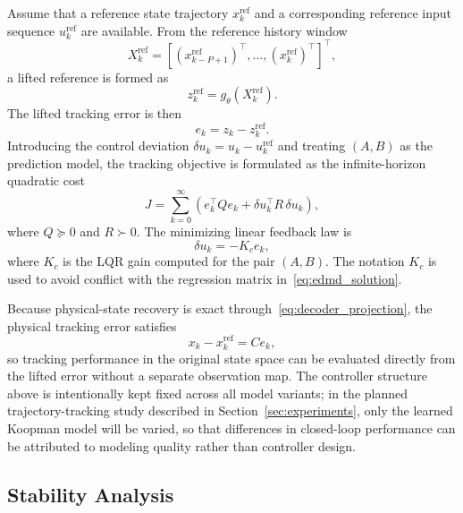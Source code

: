 \documentclass[journal]{IEEEtran}
\begin{document}
Assume that a reference state trajectory $x_k^{\mathrm{ref}}$ and a corresponding reference input sequence $u_k^{\mathrm{ref}}$ are available. From the reference history window
\begin{equation}
    X_k^{\mathrm{ref}} = [(x_{k-P+1}^{\mathrm{ref}})^\top,\ldots,(x_k^{\mathrm{ref}})^\top]^\top,
\end{equation}
a lifted reference is formed as
\begin{equation}
    z_k^{\mathrm{ref}} = g_\theta(X_k^{\mathrm{ref}}).
    \label{eq:reference_lifting}
\end{equation}
The lifted tracking error is then
\begin{equation}
    e_k = z_k - z_k^{\mathrm{ref}}.
    \label{eq:tracking_error}
\end{equation}
Introducing the control deviation $\delta u_k = u_k - u_k^{\mathrm{ref}}$ and treating $(A,B)$ as the prediction model, the tracking objective is formulated as the infinite-horizon quadratic cost
\begin{equation}
    J = \sum_{k=0}^{\infty}
    \left(e_k^\top Q e_k + \delta u_k^\top R\,\delta u_k\right),
    \label{eq:lqr_objective}
\end{equation}
where $Q\succeq 0$ and $R\succ 0$. The minimizing linear feedback law is
\begin{equation}
    \delta u_k = -K_c e_k,
    \label{eq:lqr_control}
\end{equation}
where $K_c$ is the LQR gain computed for the pair $(A,B)$. The notation $K_c$ is used to avoid conflict with the regression matrix in~\eqref{eq:edmd_solution}.

Because physical-state recovery is exact through~\eqref{eq:decoder_projection}, the physical tracking error satisfies
\begin{equation}
    x_k - x_k^{\mathrm{ref}} = C e_k,
\end{equation}
so tracking performance in the original state space can be evaluated directly from the lifted error without a separate observation map. The controller structure above is intentionally kept fixed across all model variants; in the planned trajectory-tracking study described in Section~\ref{sec:experiments}, only the learned Koopman model will be varied, so that differences in closed-loop performance can be attributed to modeling quality rather than controller design.

\subsection{Stability Analysis}
\end{document}
